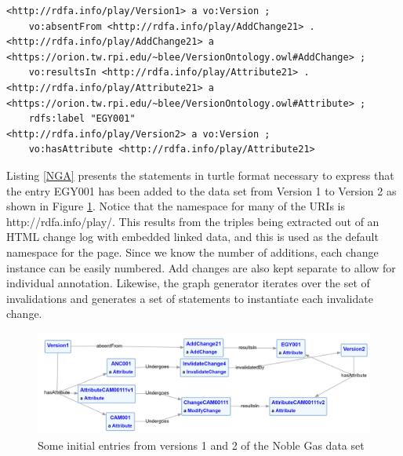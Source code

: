 \begin{lstlisting}[language=SPARQL, caption=Noble Gas Add in Turtle, label=NGA]
<http://rdfa.info/play/Version1> a vo:Version ;
	vo:absentFrom <http://rdfa.info/play/AddChange21> .
<http://rdfa.info/play/AddChange21> a <https://orion.tw.rpi.edu/~blee/VersionOntology.owl#AddChange> ;
	vo:resultsIn <http://rdfa.info/play/Attribute21> .
<http://rdfa.info/play/Attribute21> a <https://orion.tw.rpi.edu/~blee/VersionOntology.owl#Attribute> ;
	rdfs:label "EGY001"
<http://rdfa.info/play/Version2> a vo:Version ;
	vo:hasAttribute <http://rdfa.info/play/Attribute21>
\end{lstlisting}
Listing \ref{NGA} presents the statements in turtle format necessary to express that the entry EGY001 has been added to the data set from Version 1 to Version 2 as shown in Figure \ref{NobleGraph1}.
Notice that the namespace for many of the URIs is \textlangle http://rdfa.info/play/\textrangle.
This results from the triples being extracted out of an HTML change log with embedded linked data, and this is used as the default namespace for the page.
Since we know the number of additions, each change instance can be easily numbered.
Add changes are also kept separate to allow for individual annotation.
Likewise, the graph generator iterates over the set of invalidations and generates a set of statements to instantiate each invalidate change.

\begin{figure}[b]
	\centering
	\includegraphics[scale=0.30]{figures/NobleVersion.png}
	\caption{Some initial entries from versions 1 and 2 of the Noble Gas data set}
	\label{NobleGraph1}
\end{figure}


